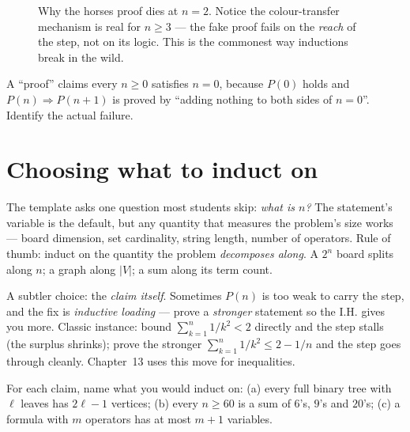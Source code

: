 \begin{figure}[ht]\centering

\caption{Why the horses proof dies at $n=2$. Notice the colour-transfer
mechanism is real for $n \ge 3$ --- the fake proof fails on the \emph{reach}
of the step, not on its logic. This is the commonest way inductions break in
the wild.}
\label{fig:horses}
\end{figure}

\begin{exercise}[medium]\label{exr:fake}
A ``proof'' claims every $n \ge 0$ satisfies $n = 0$, because $P(0)$ holds and
$P(n) \Rightarrow P(n+1)$ is proved by ``adding nothing to both sides of
$n = 0$''. Identify the actual failure.
\end{exercise}

\section{Choosing what to induct on}\label{sec:choosevar}

The template asks one question most students skip: \emph{what is $n$?}
The statement's variable is the default, but any quantity that measures the
problem's size works --- board dimension, set cardinality, string length,
number of operators. Rule of thumb: induct on the quantity the problem
\emph{decomposes along}. A $2^n$ board splits along $n$; a graph along $|V|$;
a sum along its term count.

A subtler choice: the \emph{claim itself}. Sometimes $P(n)$ is too weak to
carry the step, and the fix is \emph{inductive loading} --- prove a
\emph{stronger} statement so the I.H. gives you more. Classic instance: bound
$\sum_{k=1}^{n} 1/k^2 < 2$ directly and the step stalls (the surplus shrinks);
prove the stronger $\sum_{k=1}^{n} 1/k^2 \le 2 - 1/n$ and the step goes
through cleanly. Chapter~13 uses this move for inequalities.

\begin{exercise}[easy]\label{exr:choose}
For each claim, name what you would induct on: (a) every full binary tree with
$\ell$ leaves has $2\ell - 1$ vertices; (b) every $n \ge 60$ is a sum of
$6$'s, $9$'s and $20$'s; (c) a formula with $m$ operators has at most $m+1$
variables.
\end{exercise}

